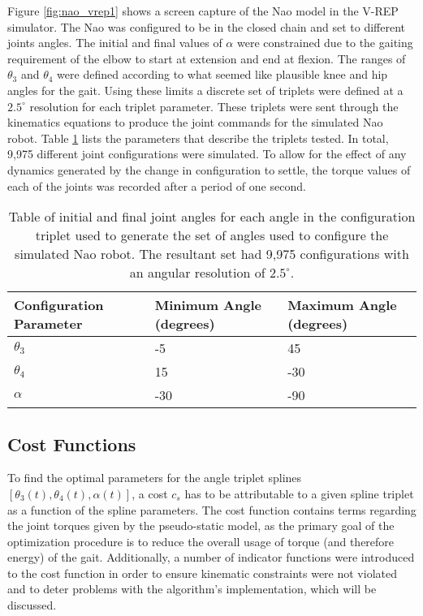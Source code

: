 Figure \ref{fig:nao_vrep1} shows a screen capture of the Nao model in the V-REP simulator. 
The Nao was configured to be in the closed chain and set to different joints angles. 
The initial and final values of $\alpha$ were constrained due to the gaiting requirement of the elbow to start at 
extension and end at flexion. The ranges of $\theta_3$ and $\theta_4$ were defined according to what seemed
like plausible knee and hip angles for the gait. Using these limits a discrete set of triplets were defined
at a $2.5^\circ$ resolution for each triplet parameter. These triplets were sent through the kinematics equations to produce the joint
commands for the simulated Nao robot. 
Table \ref{tab:angle_set_params1} lists the parameters that describe the triplets tested. In total, 9,975
different joint configurations were simulated.
To allow for the effect of
any dynamics generated by the change in configuration to settle, the torque values of each of the joints was recorded
after a period of one second.

\begin{table}
	\centering
	\begin{tabularx}{0.65 \textwidth}{|X||X|X|}
		\hline
		\textbf{Configuration Parameter} 	&	\textbf{Minimum Angle (degrees)} 		&	\textbf{Maximum Angle (degrees)} 	\\	\hline\hline
		$\theta_3$ 	  & 	-5   &	 45 	\\	\hline
		$\theta_4$		&	  15	 &	-30	  \\ 	\hline
		$\alpha$			&  -30	 &	-90		\\ 	\hline
	\end{tabularx} 
	
	\caption{Table of initial and final joint angles for each angle in the configuration triplet used to generate the set of
				angles used to configure the simulated Nao robot.
				The resultant set had 9,975 configurations with an angular resolution of $2.5^\circ$.}
	\label{tab:angle_set_params1}
\end{table}

\subsection{Cost Functions} \label{subsec:cost_functions}

To find the optimal parameters for the angle triplet splines $[\theta_3(t), \theta_4(t), \alpha(t)]$, 
a cost $c_s$ has to be attributable to a given spline triplet as a function of the spline parameters.
The cost function contains terms regarding the joint torques given by the pseudo-static model, as
the primary goal of the optimization procedure is to reduce the overall usage of torque
(and therefore energy) of the gait. Additionally, a number of indicator functions
were introduced to the cost function in order to ensure kinematic constraints were not violated
and to deter problems with the algorithm's implementation, which will be discussed.

